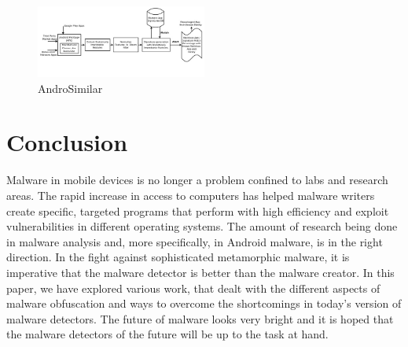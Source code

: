 \begin{figure}[htb]
	\centering
	\includegraphics[width=0.5\textwidth]{androSimilar.jpg}
	\caption{AndroSimilar} 
	\label{fig:andro}
\end{figure}

\section{Conclusion}

Malware in mobile devices is no longer a problem confined to labs and research areas. The rapid increase in access to computers has helped malware writers create specific, targeted programs that perform with high efficiency and exploit vulnerabilities in different operating systems. The amount of research being done in malware analysis and, more specifically, in Android malware, is in the right direction. In the fight against sophisticated metamorphic malware, it is imperative that the malware detector is better than the malware creator. In this paper, we have explored various work, that dealt with the different aspects of malware obfuscation and ways to overcome the shortcomings in today\textquoteright s version of malware detectors. The future of malware looks very bright and it is hoped that the malware detectors of the future will be up to the task at hand.

